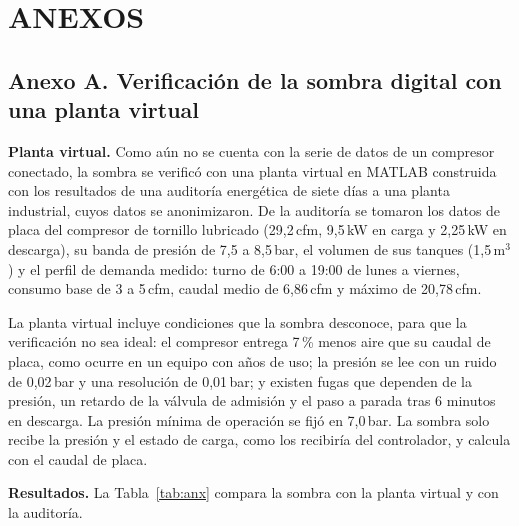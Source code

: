 \chapter*{\center \Large ANEXOS}
\setcounter{figure}{0}
\setcounter{table}{0}

\section*{Anexo A. Verificación de la sombra digital con una planta virtual}

\textbf{Planta virtual.} Como aún no se cuenta con la serie de datos de un compresor conectado, la sombra se verificó con una planta virtual en MATLAB construida con los resultados de una auditoría energética de siete días a una planta industrial, cuyos datos se anonimizaron. De la auditoría se tomaron los datos de placa del compresor de tornillo lubricado (29,2\,cfm, 9,5\,kW en carga y 2,25\,kW en descarga), su banda de presión de 7,5 a 8,5\,bar, el volumen de sus tanques (1,5\,m$^3$) y el perfil de demanda medido: turno de 6:00 a 19:00 de lunes a viernes, consumo base de 3 a 5\,cfm, caudal medio de 6,86\,cfm y máximo de 20,78\,cfm.

La planta virtual incluye condiciones que la sombra desconoce, para que la verificación no sea ideal: el compresor entrega 7\,\% menos aire que su caudal de placa, como ocurre en un equipo con años de uso; la presión se lee con un ruido de 0,02\,bar y una resolución de 0,01\,bar; y existen fugas que dependen de la presión, un retardo de la válvula de admisión y el paso a parada tras 6 minutos en descarga. La presión mínima de operación se fijó en 7,0\,bar. La sombra solo recibe la presión y el estado de carga, como los recibiría del controlador, y calcula con el caudal de placa.

\textbf{Resultados.} La Tabla~\ref{tab:anx} compara la sombra con la planta virtual y con la auditoría.


